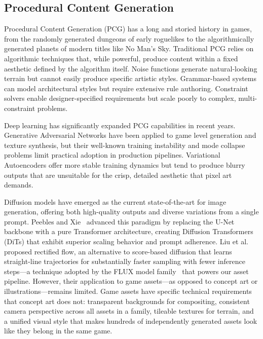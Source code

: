 \documentclass[conference]{IEEEtran}
\begin{document}
\subsection{Procedural Content Generation}

Procedural Content Generation (PCG) has a long and storied history in games, from the randomly generated dungeons of early roguelikes to the algorithmically generated planets of modern titles like No Man's Sky. Traditional PCG relies on algorithmic techniques that, while powerful, produce content within a fixed aesthetic defined by the algorithm itself. Noise functions generate natural-looking terrain but cannot easily produce specific artistic styles. Grammar-based systems can model architectural styles but require extensive rule authoring. Constraint solvers enable designer-specified requirements but scale poorly to complex, multi-constraint problems.

Deep learning has significantly expanded PCG capabilities in recent years. Generative Adversarial Networks have been applied to game level generation and texture synthesis, but their well-known training instability and mode collapse problems limit practical adoption in production pipelines. Variational Autoencoders offer more stable training dynamics but tend to produce blurry outputs that are unsuitable for the crisp, detailed aesthetic that pixel art demands.

Diffusion models have emerged as the current state-of-the-art for image generation, offering both high-quality outputs and diverse variations from a single prompt. Peebles and Xie~\cite{peebles2023scalable} advanced this paradigm by replacing the U-Net backbone with a pure Transformer architecture, creating Diffusion Transformers (DiTs) that exhibit superior scaling behavior and prompt adherence. Liu et al.~\cite{liu2023rectified} proposed rectified flow, an alternative to score-based diffusion that learns straight-line trajectories for substantially faster sampling with fewer inference steps---a technique adopted by the FLUX model family~\cite{esser2024scaling} that powers our asset pipeline. However, their application to game assets---as opposed to concept art or illustrations---remains limited. Game assets have specific technical requirements that concept art does not: transparent backgrounds for compositing, consistent camera perspective across all assets in a family, tileable textures for terrain, and a unified visual style that makes hundreds of independently generated assets look like they belong in the same game.
\end{document}
